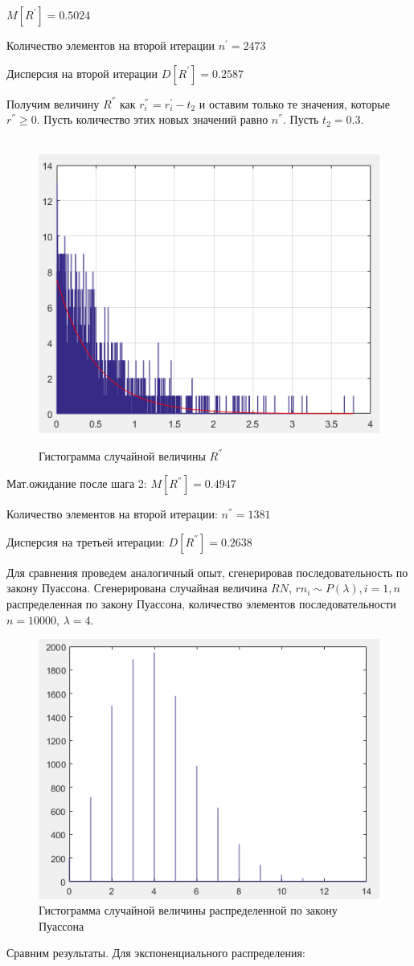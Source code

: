 $M[R^{'}]= 0.5024$

Количество элементов на второй итерации $n^{'}=2473$

Дисперсия на второй итерации $D[R^{'}] = 0.2587 $

Получим величину $R^{''}$ как $r_{i}^{''}{}^ {}=r_{i}^{'}-t_{2}$
и оставим только те значения, которые $r^{''}\geq0$. Пусть количество
этих новых значений равно $n^{''}$. Пусть $t_{2}=0.3.$ 
\begin{figure}[h]
	\centering\
	\includegraphics[width=0.4\linewidth]{img/kich_bur/image4.png}
	\caption{Гистограмма случайной величины $R^{''}$ }
	\label{fig:img4}
\end{figure}

Мат.ожидание после шага 2: $M[R^{''}]= 0.4947 $

Количество элементов на второй итерации: $n^{''}= 1381 $

Дисперсия на третьей итерации: $D[R^{''}]= 0.2638 $

Для сравнения проведем аналогичный опыт, сгенерировав последовательность
по закону Пуассона. Сгенерирована случайная величина $ RN $, $rn_{i}\sim
P(\lambda),i=1,n$ распределенная по закону Пуассона, количество элементов
последовательности $n=10000$, $\lambda=4$.
 
\begin{figure}[h]
	\centering
	\includegraphics[width=0.4\linewidth]{img/kich_bur/image5.png} 
	\caption{Гистограмма случайной величины распределенной по закону Пуассона}
	\label{fig:img5}
\end{figure}

Сравним результаты. Для экспоненциального распределения: 

